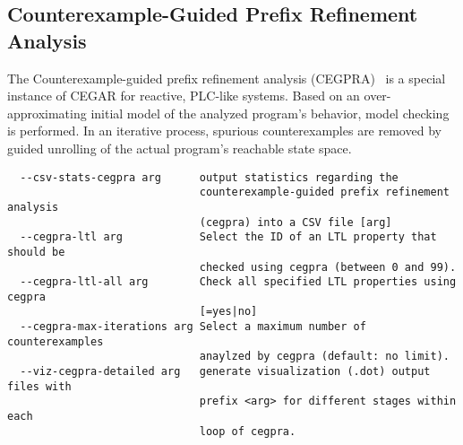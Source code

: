 \documentclass[natbib]{article}
\begin{document}
\subsection{Counterexample-Guided Prefix Refinement Analysis}
The Counterexample-guided prefix refinement analysis (CEGPRA)~\cite{jasper2014counterexample} is a special instance 
of CEGAR for reactive, PLC-like systems.
Based on an over-approximating initial model of the analyzed program's behavior, model checking is performed. In an iterative process, spurious counterexamples are removed by guided unrolling of the actual program's reachable state space. 
\begin{verbatim}
  --csv-stats-cegpra arg      output statistics regarding the 
                              counterexample-guided prefix refinement analysis 
                              (cegpra) into a CSV file [arg]
  --cegpra-ltl arg            Select the ID of an LTL property that should be 
                              checked using cegpra (between 0 and 99).
  --cegpra-ltl-all arg        Check all specified LTL properties using cegpra 
                              [=yes|no]
  --cegpra-max-iterations arg Select a maximum number of counterexamples 
                              anaylzed by cegpra (default: no limit).
  --viz-cegpra-detailed arg   generate visualization (.dot) output files with 
                              prefix <arg> for different stages within each 
                              loop of cegpra.
\end{verbatim}
\end{document}
